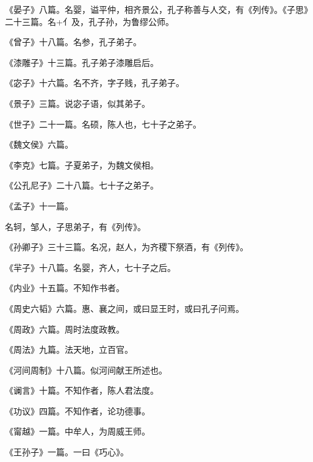 \documentclass[12pt,UTF8]{ctexbook}
\begin{document}
《晏子》八篇。名婴，谥平仲，相齐景公，孔子称善与人交，有《列传》。《子思》二十三篇。名+亻及，孔子孙，为鲁缪公师。



《曾子》十八篇。名参，孔子弟子。



《漆雕子》十三篇。孔子弟子漆雕启后。



《宓子》十六篇。名不齐，字子贱，孔子弟子。



《景子》三篇。说宓子语，似其弟子。



《世子》二十一篇。名硕，陈人也，七十子之弟子。



《魏文侯》六篇。



《李克》七篇。子夏弟子，为魏文侯相。



《公孔尼子》二十八篇。七十子之弟子。



《孟子》十一篇。



名轲，邹人，子思弟子，有《列传》。



《孙卿子》三十三篇。名况，赵人，为齐稷下祭酒，有《列传》。



《羋子》十八篇。名婴，齐人，七十子之后。



《内业》十五篇。不知作书者。



《周史六韬》六篇。惠、襄之间，或曰显王时，或曰孔子问焉。



《周政》六篇。周时法度政教。



《周法》九篇。法天地，立百官。



《河间周制》十八篇。似河间献王所述也。



《谰言》十篇。不知作者，陈人君法度。



《功议》四篇。不知作者，论功德事。



《甯越》一篇。中牟人，为周威王师。



《王孙子》一篇。一曰《巧心》。
\end{document}
